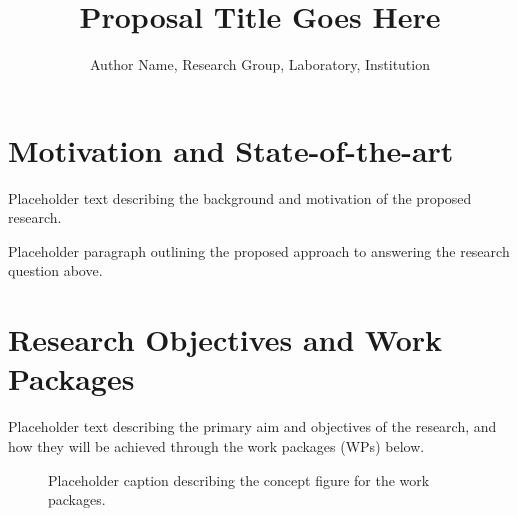 \documentclass[twocolumn]{NobArticle}
\title{Proposal Title Goes Here}
\author{
    Author Name, Research Group, Laboratory, Institution
}
\begin{document}
\small
\maketitle

\section{Motivation and State-of-the-art}

Placeholder text describing the background and motivation of the proposed research.

\begin{figure}[h!]
\noindent{}
\end{figure}

Placeholder paragraph outlining the proposed approach to answering the research question above.

\section{Research Objectives and Work Packages}


Placeholder text describing the primary aim and objectives of the research, and how they will be achieved through the work packages (WPs) below.

\begin{figure}[t!]
\centering
\vspace{-1.5mm}
\caption{\label{fig:placeholder1} Placeholder caption describing the concept figure for the work packages.}
\vspace{-3.5mm} %
\end{figure}
\end{document}
